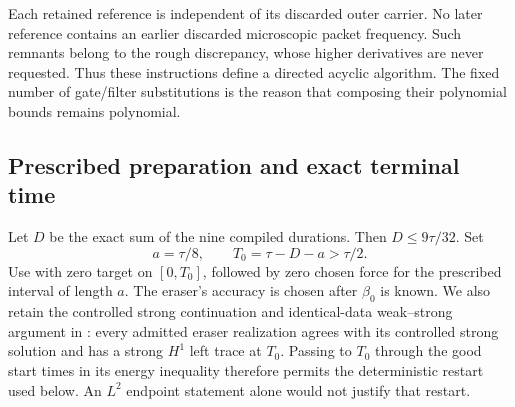\documentclass[11pt,a4paper]{amsart}
\theoremstyle{definition}
\theoremstyle{remark}
\numberwithin{equation}{section}
\begin{document}
Each retained reference is independent of its discarded outer carrier.
No later reference contains an earlier discarded microscopic packet
frequency. Such remnants belong to the rough discrepancy, whose higher
derivatives are never requested. Thus these instructions define a directed
acyclic algorithm. The fixed number of gate/filter substitutions is the
reason that composing their polynomial bounds remains polynomial.

\subsection{Prescribed preparation and exact terminal time}
Let $D$ be the exact sum of the nine compiled durations. Then
$D\le9\tau/32$. Set
\begin{equation}\label{eq:clock}
 a=\tau/8,\qquad T_0=\tau-D-a>\tau/2.
\end{equation}
Use \cite[Theorem~2.2]{Common} with zero target on $[0,T_0]$, followed by
zero chosen force for the prescribed interval of length $a$. The eraser's
accuracy is chosen after $\beta_0$ is known.
We also retain the controlled strong continuation and identical-data
weak--strong argument in \cite[Section~10]{Common}: every admitted eraser
realization agrees with its controlled strong solution and has a strong
$H^1$ left trace at $T_0$. Passing to $T_0$ through the good start times
in its energy inequality therefore permits the deterministic restart used
below. An $L^2$ endpoint statement alone would not justify that restart.
\end{document}
